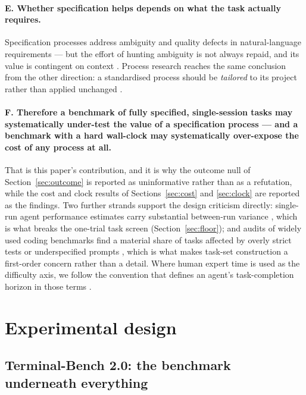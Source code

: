\documentclass[11pt,a4paper]{article}
\begin{document}
\paragraph{E. Whether specification helps depends on what the task actually requires.}
Specification processes address ambiguity and quality defects in natural-language requirements
\citep{femmer2017smells} --- but the effort of hunting ambiguity is not always repaid, and its
value is contingent on context \citep{ribeiro2020ambiguity}. Process research reaches the same
conclusion from the other direction: a standardised process should be \emph{tailored} to its
project rather than applied unchanged \citep{xu2007tailoring}.

\paragraph{F. Therefore a benchmark of fully specified, single-session tasks may systematically
under-test the value of a specification process --- and a benchmark with a hard wall-clock may
systematically over-expose the cost of any process at all.} That is this paper's contribution,
and it is why the outcome null of Section~\ref{sec:outcome} is reported as uninformative rather
than as a refutation, while the cost and clock results of Sections~\ref{sec:cost} and
\ref{sec:clock} are reported as the findings. Two further strands support the design
criticism directly: single-run agent performance estimates carry substantial between-run
variance \citep{bjarnason2026randomness}, which is what breaks the one-trial task screen
(Section~\ref{sec:floor}); and audits of widely used coding benchmarks find a material share
of tasks affected by overly strict tests or underspecified prompts \citep{openai2026signal},
which is what makes task-set construction a first-order concern rather than a detail. Where
human expert time is used as the difficulty axis, we follow the convention that defines an
agent's task-completion horizon in those terms \citep{kwa2025horizons}.

\clearpage
\section{Experimental design}
\label{sec:design}

\subsection{Terminal-Bench 2.0: the benchmark underneath everything}
\end{document}
